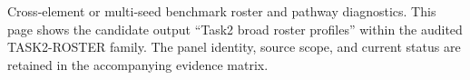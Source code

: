 Cross-element or multi-seed benchmark roster and pathway diagnostics. This page shows the candidate output ``Task2 broad roster profiles'' within the audited TASK2-ROSTER family. The panel identity, source scope, and current status are retained in the accompanying evidence matrix.
